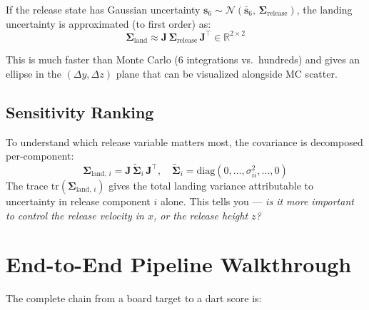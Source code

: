 \documentclass[11pt,letterpaper]{article}
\begin{document}
If the release state has Gaussian uncertainty $\bm{s}_6 \sim \mathcal{N}(\bar{\bm{s}}_6,\, \boldsymbol{\Sigma}_{\text{release}})$, the landing uncertainty is approximated (to first order) as:
\begin{equation}
  \boldsymbol{\Sigma}_{\text{land}} \approx \mathbf{J}\,\boldsymbol{\Sigma}_{\text{release}}\,\mathbf{J}^\top \in \mathbb{R}^{2 \times 2}
  \label{eq:cov-prop}
\end{equation}

This is much faster than Monte Carlo (6 integrations vs.\ hundreds) and gives an ellipse in the $(\Delta y, \Delta z)$ plane that can be visualized alongside MC scatter.

\subsection{Sensitivity Ranking}

To understand which release variable matters most, the covariance is decomposed per-component:
\begin{equation}
  \boldsymbol{\Sigma}_{\text{land},\,i} = \mathbf{J}\,\tilde{\boldsymbol{\Sigma}}_i\,\mathbf{J}^\top,
  \quad \tilde{\boldsymbol{\Sigma}}_i = \text{diag}(0,\ldots,\sigma_{ii}^2,\ldots,0)
\end{equation}
The trace $\text{tr}(\boldsymbol{\Sigma}_{\text{land},\,i})$ gives the total landing variance attributable to uncertainty in release component $i$ alone. This tells you — \emph{is it more important to control the release velocity in $x$, or the release height $z$?}

\section{End-to-End Pipeline Walkthrough}

The complete chain from a board target to a dart score is:
\end{document}
